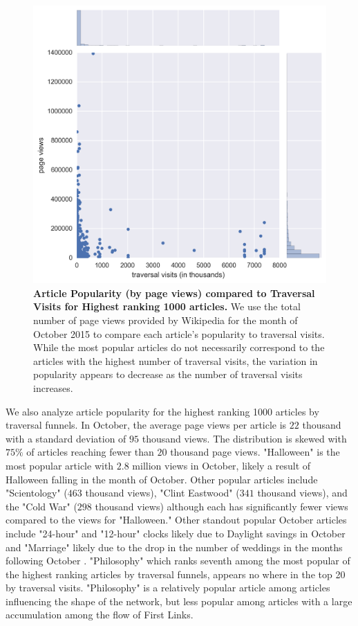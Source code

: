 \documentclass[pre,twocolumn,twoside,superscriptaddress,floatfix, aps, 10pt]{revtex4-1}
\begin{document}
\begin{figure}[tp!]
  \centering	
  \includegraphics[width=\columnwidth]{graphics/views_visits.png}
  \caption{
    \textbf{Article Popularity (by page views) compared to Traversal Visits 
    for Highest ranking 1000 articles.}
    We use the total number of page views provided by Wikipedia for the month
    of October 2015 to compare each article's popularity to traversal visits.
    While the most popular articles do not necessarily correspond to the articles
    with the highest number of traversal visits, the variation in popularity appears to decrease as the number of traversal visits increases.
  }
  \label{fig:Views and Visits}

\end{figure}



We also analyze article popularity for the highest ranking 1000 articles by 
traversal funnels. In October, the average page views per article is 
$22$ thousand with a standard deviation of $95$ thousand views. The distribution
is skewed with $75\%$ of articles reaching fewer than $20$ thousand page views. 
"Halloween" is the most popular article with $2.8$ million views in October,
likely a result of Halloween falling in the month of October. 
Other popular articles include "Scientology" ($463$ thousand views), "Clint Eastwood" 
($341$ thousand views),
and the "Cold War" ($298$ thousand views) although each has significantly fewer views compared to the views for "Halloween."
Other standout popular October articles include "24-hour" and "12-hour" clocks likely due
to Daylight savings in October and "Marriage" likely due to the drop in the number of
weddings in the months following October
\cite{weddings}.
"Philosophy" which ranks seventh among the most popular of the highest ranking articles by traversal funnels, appears no where in the top 20
by traversal visits. "Philosophy" is a relatively popular article 
among articles influencing the shape of the network, but less popular among 
articles with a large accumulation among the flow of First Links.
\end{document}
